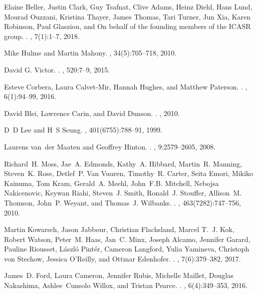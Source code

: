 \documentclass{article}
\begin{document}
\begin{thebibliography}{10}
	Elaine Beller, Justin Clark, Guy Tsafnat, Clive Adams, Heinz Diehl, Hans Lund,
	Mourad Ouzzani, Kristina Thayer, James Thomas, Tari Turner, Jun Xia, Karen
	Robinson, Paul Glasziou, and {On behalf of the founding members of the ICASR
		group}.
	.
	, 7(1):1--7, 2018.
	
	Mike Hulme and Martin Mahony.
	, 34(5):705--718, 2010.
	
	{David G. Victor}.
	.
	, 520:7--9, 2015.
	
	Esteve Corbera, Laura Calvet-Mir, Hannah Hughes, and Matthew Paterson.
	.
	, 6(1):94--99, 2016.
	
	David Blei, Lawrence Carin, and David Dunson.
	.
	, 2010.
	
	D~D Lee and H~S Seung.
	, 401(6755):788--91, 1999.
	
	Laurens van~der Maaten and Geoffrey Hinton.
	.
	, 9:2579--2605, 2008.
	
	Richard~H. Moss, Jae~A. Edmonds, Kathy~A. Hibbard, Martin~R. Manning, Steven~K.
	Rose, Detlef~P. {Van Vuuren}, Timothy~R. Carter, Seita Emori, Mikiko Kainuma,
	Tom Kram, Gerald~A. Meehl, John~F.B. Mitchell, Nebojsa Nakicenovic, Keywan
	Riahi, Steven~J. Smith, Ronald~J. Stouffer, Allison~M. Thomson, John~P.
	Weyant, and Thomas~J. Wilbanks.
	.
	, 463(7282):747--756, 2010.
	
	Martin Kowarsch, Jason Jabbour, Christian Flachsland, Marcel T.~J. Kok, Robert
	Watson, Peter~M. Haas, Jan~C. Minx, Joseph Alcamo, Jennifer Garard, Pauline
	Riousset, L{\'{a}}szl{\'{o}} Pint{\'{e}}r, Cameron Langford, Yulia Yamineva,
	Christoph von Stechow, Jessica O'Reilly, and Ottmar Edenhofer.
	.
	, 7(6):379--382, 2017.
	
	James~D. Ford, Laura Cameron, Jennifer Rubis, Michelle Maillet, Douglas
	Nakashima, Ashlee~Cunsolo Willox, and Tristan Pearce.
	.
	, 6(4):349--353, 2016.
	
\end{thebibliography}

	
	
	
\end{document}
